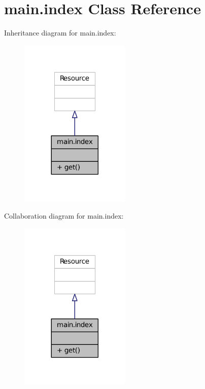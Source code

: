 \hypertarget{classmain_1_1index}{}\section{main.\+index Class Reference}
\label{classmain_1_1index}


Inheritance diagram for main.\+index\+:
\nopagebreak
\begin{figure}[H]
\begin{center}
\leavevmode
\includegraphics[width=149pt]{classmain_1_1index__inherit__graph}
\end{center}
\end{figure}


Collaboration diagram for main.\+index\+:
\nopagebreak
\begin{figure}[H]
\begin{center}
\leavevmode
\includegraphics[width=149pt]{classmain_1_1index__coll__graph}
\end{center}
\end{figure}
